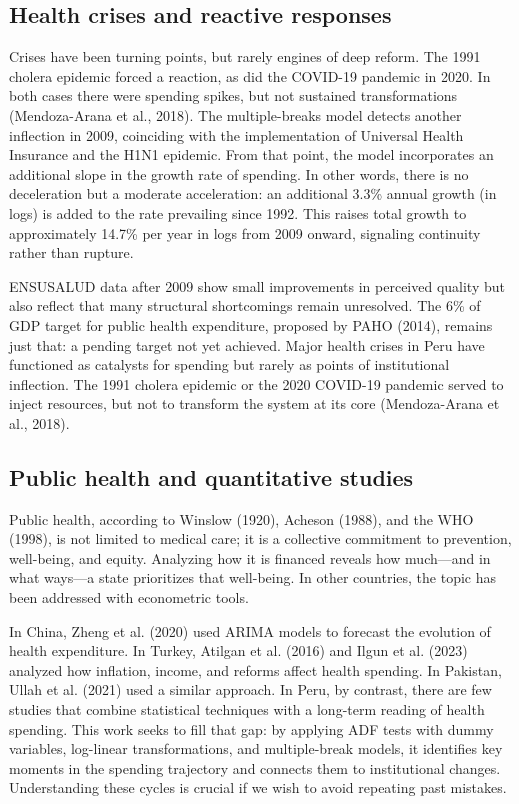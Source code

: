 \documentclass[12pt]{article}
\begin{document}
\subsection{Health crises and reactive responses}

Crises have been turning points, but rarely engines of deep reform. The 1991 cholera epidemic forced a reaction, as did the COVID-19 pandemic in 2020. In both cases there were spending spikes, but not sustained transformations (Mendoza-Arana et al., 2018). The multiple-breaks model detects another inflection in 2009, coinciding with the implementation of Universal Health Insurance and the H1N1 epidemic. From that point, the model incorporates an additional slope in the growth rate of spending. In other words, there is no deceleration but a moderate acceleration: an additional 3.3\% annual growth (in logs) is added to the rate prevailing since 1992. This raises total growth to approximately 14.7\% per year in logs from 2009 onward, signaling continuity rather than rupture.

ENSUSALUD data after 2009 show small improvements in perceived quality but also reflect that many structural shortcomings remain unresolved. The 6\% of GDP target for public health expenditure, proposed by PAHO (2014), remains just that: a pending target not yet achieved. Major health crises in Peru have functioned as catalysts for spending but rarely as points of institutional inflection. The 1991 cholera epidemic or the 2020 COVID-19 pandemic served to inject resources, but not to transform the system at its core (Mendoza-Arana et al., 2018).

\subsection{Public health and quantitative studies}

Public health, according to Winslow (1920), Acheson (1988), and the WHO (1998), is not limited to medical care; it is a collective commitment to prevention, well-being, and equity. Analyzing how it is financed reveals how much—and in what ways—a state prioritizes that well-being. In other countries, the topic has been addressed with econometric tools.

In China, Zheng et al. (2020) used ARIMA models to forecast the evolution of health expenditure. In Turkey, Atilgan et al. (2016) and Ilgun et al. (2023) analyzed how inflation, income, and reforms affect health spending. In Pakistan, Ullah et al. (2021) used a similar approach. In Peru, by contrast, there are few studies that combine statistical techniques with a long-term reading of health spending. This work seeks to fill that gap: by applying ADF tests with dummy variables, log-linear transformations, and multiple-break models, it identifies key moments in the spending trajectory and connects them to institutional changes. Understanding these cycles is crucial if we wish to avoid repeating past mistakes.
\end{document}
